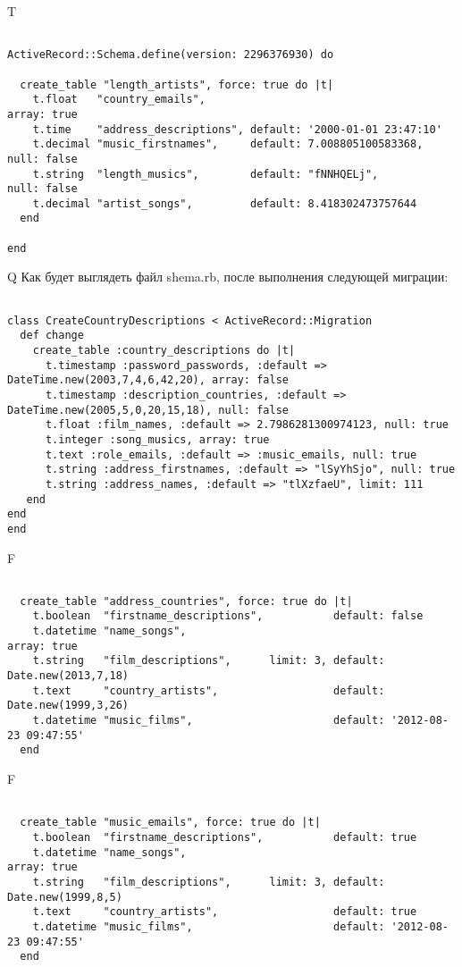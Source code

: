 T
\begin{verbatim}

ActiveRecord::Schema.define(version: 2296376930) do

  create_table "length_artists", force: true do |t|
    t.float   "country_emails",                                                    array: true
    t.time    "address_descriptions", default: '2000-01-01 23:47:10'
    t.decimal "music_firstnames",     default: 7.008805100583368,     null: false
    t.string  "length_musics",        default: "fNNHQELj",            null: false
    t.decimal "artist_songs",         default: 8.418302473757644
  end

end
\end{verbatim}

Q
Как будет выглядеть файл shema.rb, после выполнения следующей миграции:

\begin{verbatim}

class CreateCountryDescriptions < ActiveRecord::Migration 
  def change 
    create_table :country_descriptions do |t| 
      t.timestamp :password_passwords, :default => DateTime.new(2003,7,4,6,42,20), array: false
      t.timestamp :description_countries, :default => DateTime.new(2005,5,0,20,15,18), null: false
      t.float :film_names, :default => 2.7986281300974123, null: true
      t.integer :song_musics, array: true
      t.text :role_emails, :default => :music_emails, null: true
      t.string :address_firstnames, :default => "lSyYhSjo", null: true
      t.string :address_names, :default => "tlXzfaeU", limit: 111
   end
end
end
\end{verbatim}

F
\begin{verbatim}

  create_table "address_countries", force: true do |t|
    t.boolean  "firstname_descriptions",           default: false
    t.datetime "name_songs",                                                       array: true
    t.string   "film_descriptions",      limit: 3, default: Date.new(2013,7,18)
    t.text     "country_artists",                  default: Date.new(1999,3,26)
    t.datetime "music_films",                      default: '2012-08-23 09:47:55'
  end

\end{verbatim}

F
\begin{verbatim}

  create_table "music_emails", force: true do |t|
    t.boolean  "firstname_descriptions",           default: true
    t.datetime "name_songs",                                                       array: true
    t.string   "film_descriptions",      limit: 3, default: Date.new(1999,8,5)
    t.text     "country_artists",                  default: true
    t.datetime "music_films",                      default: '2012-08-23 09:47:55'
  end

\end{verbatim}

